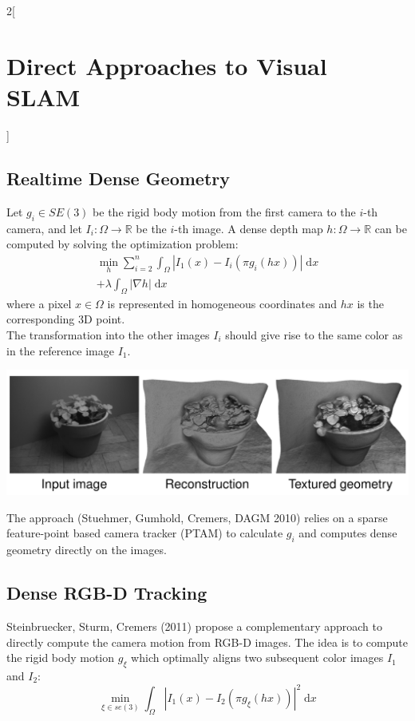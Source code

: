 \documentclass[oneside,fontsize=11pt,paper=a4]{scrartcl}
\newenvironment{myfigure}
  {\par\medskip\noindent\minipage{\linewidth}}
  {\endminipage\par\medskip}
\begin{document}
\begin{multicols}{2}[\section{Direct Approaches to Visual SLAM}]
\subsection{Realtime Dense Geometry}
Let $g_i \in SE(3)$ be the rigid body motion from the first camera to the $i$-th camera, and let $I_i: \Omega \rightarrow \mathbb{R}$ be the $i$-th image.
A dense depth map $h: \Omega \rightarrow \mathbb{R}$ can be computed by solving the optimization problem: 
\begin{equation*}
\begin{split}
    \min_h \sum_{i=2}^n \int_{\Omega} |I_1(x) - I_i(\pi g_i (hx)) | \;\mathrm{d}x \\  + \lambda \int_{\Omega} |\nabla h| \;\mathrm{d}x
\end{split}
\end{equation*}
where a pixel $x \in \Omega$ is represented in homogeneous coordinates and $hx$ is
the corresponding 3D point.\\
The transformation into the other images $I_i$ should give rise to the same color as in the reference image $I_1$. 
\begin{myfigure}
	\centering
	\includegraphics[width=0.9\linewidth]{Images/Realtime_dense_geometry.jpg}
\end{myfigure}
The approach (Stuehmer, Gumhold, Cremers, DAGM 2010) relies on a sparse feature-point based camera tracker (PTAM) to calculate $g_i$ and computes dense geometry directly on the images. 

\subsection{Dense RGB-D Tracking}
Steinbruecker, Sturm, Cremers (2011) propose a complementary approach to directly compute the camera motion from RGB-D images.
The idea is to compute the rigid body motion $g_{\xi}$ which optimally aligns two subsequent color images $I_1$ and $I_2$:
\begin{equation*}
	\min_{\xi \in se(3)} \int_{\Omega} |I_1(x) - I_2(\pi g_{\xi}(hx))|^2 \;\mathrm{d}x
\end{equation*}


\end{multicols}
\end{document}
